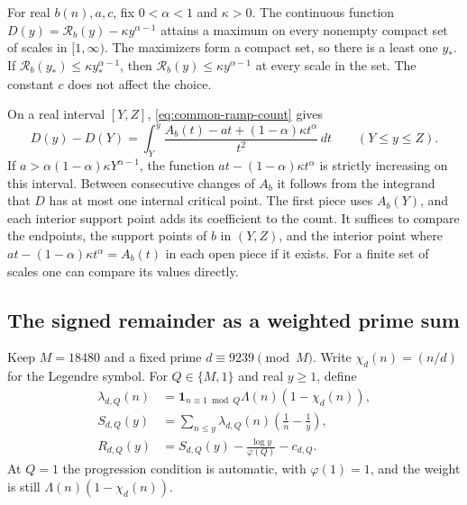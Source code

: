 %
For real \(b(n),a,c\), fix \(0<\alpha<1\) and \(\kappa>0\).
The continuous function \(D(y)=\mathcal R_b(y)-\kappa y^{\alpha-1}\)
attains a maximum on every nonempty compact set of scales in \([1,\infty)\).
The maximizers form a compact set, so there is a least one \(y_*\).
If \(\mathcal R_b(y_*)\le \kappa y_*^{\alpha-1}\), then
\(\mathcal R_b(y)\le \kappa y^{\alpha-1}\) at every scale in the set.
The constant \(c\) does not affect the choice.

On a real interval \([Y,Z]\), \eqref{eq:common-ramp-count} gives
\begin{equation}\label{eq:common-ramp-maximum}
 D(y)-D(Y)=\int_Y^y
      \frac{A_b(t)-at+(1-\alpha)\kappa t^\alpha}{t^2}\,dt
       \qquad (Y\le y\le Z).
\end{equation}
If \(a>\alpha(1-\alpha)\kappa Y^{\alpha-1}\), the function
\(at-(1-\alpha)\kappa t^\alpha\) is strictly increasing on this interval.
Between consecutive changes of \(A_b\) it follows from the integrand
that \(D\) has at most one internal critical point.
The first piece uses \(A_b(Y)\), and each interior support point
adds its coefficient to the count.
It suffices to compare the endpoints, the support points of \(b\)
in \((Y,Z)\), and the interior point where
\(at-(1-\alpha)\kappa t^\alpha=A_b(t)\) in each open piece if it exists.
For a finite set of scales one can compare its values directly.

\subsection*{The signed remainder as a weighted prime sum}

%
Keep \(M=18480\) and a fixed prime \(d\equiv9239\pmod M\). Write
\(\chi_d(n)=(n/d)\) for the Legendre symbol. For \(Q\in\{M,1\}\) and
real \(y\ge1\), define
\begin{align*}
 \lambda_{d,Q}(n)&=\mathbf{1}_{n\equiv1\bmod Q}\Lambda(n)(1-\chi_d(n)),\\
 S_{d,Q}(y)&=\sum_{n\le y}\lambda_{d,Q}(n)\left(\frac1n-\frac1y\right),\\
 R_{d,Q}(y)&=S_{d,Q}(y)-\frac{\log y}{\varphi(Q)}-c_{d,Q}.
\end{align*}
At \(Q=1\) the progression condition is automatic, with \(\varphi(1)=1\),
and the weight is still \(\Lambda(n)(1-\chi_d(n))\).

